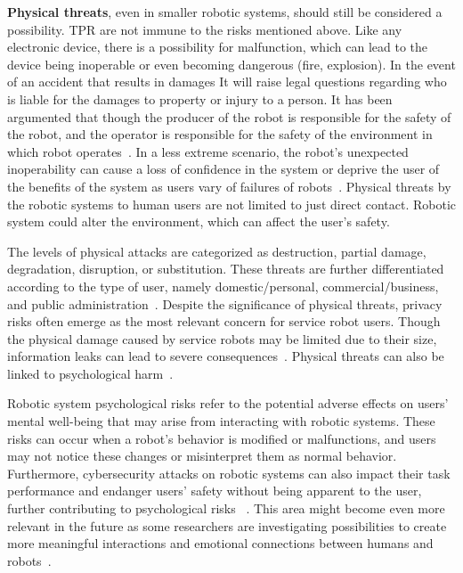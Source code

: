 \textbf{Physical threats}, even in smaller robotic systems, should still be considered a possibility. \ac{TPR} are not immune to the risks mentioned above. Like any electronic device, there is a possibility for malfunction, which can lead to the device being inoperable or even becoming dangerous (fire, explosion). In the event of an accident that results in damages
It will raise legal questions regarding who is liable for the damages to property or injury to a person. It has been argumented that though
the producer of the robot is responsible for the safety of the robot, and the operator is responsible for the safety of the environment in
which robot operates~\cite[]{if_robots_cause_harm_2016}.
In a less extreme scenario, the robot's
unexpected inoperability can cause a loss
of confidence in the system or deprive the user of the benefits of the system as users vary of failures of robots~\cite[9-10]{
  higher_edu_perception_on_tprs_2022}. Physical threats by the robotic systems to human users are not limited to just
direct contact. Robotic system could alter the environment, which can affect the user's safety.

The levels of physical attacks are categorized as destruction, partial damage, degradation, disruption, or substitution. These threats are
further
differentiated according to the type of user, namely domestic/personal, commercial/business, and public administration~\cite[80]{cyber_sec_robotics_privacy_safety_2017}.
Despite the significance of physical threats, privacy risks often emerge as the most relevant concern for service robot users. Though the
physical damage caused by service robots may be limited due to their size, information leaks can lead to severe consequences~\cite[83]{
  cyber_sec_robotics_privacy_safety_2017}. Physical threats can also be linked to psychological harm~\cite[5]{cyber_sec_safety_robots_legal_2021}.

Robotic system psychological risks refer to the potential adverse effects on users' mental well-being that may arise from interacting
with robotic systems. These risks can occur when a robot's behavior is modified or malfunctions, and users may not notice these
changes
or misinterpret them as normal behavior. Furthermore, cybersecurity attacks on robotic systems can also impact their task performance and
endanger users' safety without being apparent to the user, further contributing to psychological risks ~\cite[5]{
  cyber_sec_safety_robots_legal_2021}. This area might become even more relevant in the future as some researchers are investigating
possibilities to create more meaningful interactions and emotional connections between humans and robots~\cite[186]{smart_design_engineering_2020}.

